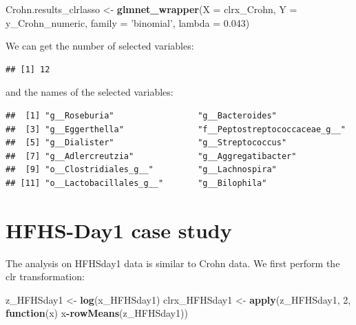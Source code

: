 \documentclass[openany]{book}
\newenvironment{Shaded}{\begin{snugshade}}{\end{snugshade}}
\newcommand{\KeywordTok}[1]{\textcolor[rgb]{0.13,0.29,0.53}{\textbf{#1}}}
\newcommand{\DataTypeTok}[1]{\textcolor[rgb]{0.13,0.29,0.53}{#1}}
\newcommand{\DecValTok}[1]{\textcolor[rgb]{0.00,0.00,0.81}{#1}}
\newcommand{\FloatTok}[1]{\textcolor[rgb]{0.00,0.00,0.81}{#1}}
\newcommand{\StringTok}[1]{\textcolor[rgb]{0.31,0.60,0.02}{#1}}
\newcommand{\ControlFlowTok}[1]{\textcolor[rgb]{0.13,0.29,0.53}{\textbf{#1}}}
\newcommand{\OperatorTok}[1]{\textcolor[rgb]{0.81,0.36,0.00}{\textbf{#1}}}
\newcommand{\NormalTok}[1]{#1}
\begin{document}
\begin{Shaded}
\begin{Highlighting}[]
\NormalTok{Crohn.results_clrlasso <-}\StringTok{ }\KeywordTok{glmnet_wrapper}\NormalTok{(}\DataTypeTok{X =}\NormalTok{ clrx_Crohn, }\DataTypeTok{Y =}\NormalTok{ y_Crohn_numeric, }
                                         \DataTypeTok{family =} \StringTok{'binomial'}\NormalTok{, }\DataTypeTok{lambda =} \FloatTok{0.043}\NormalTok{)}
\end{Highlighting}
\end{Shaded}

We can get the number of selected variables:

\begin{Shaded}
\end{Shaded}

\begin{verbatim}
## [1] 12
\end{verbatim}

and the names of the selected variables:

\begin{Shaded}
\end{Shaded}

\begin{verbatim}
##  [1] "g__Roseburia"                 "g__Bacteroides"              
##  [3] "g__Eggerthella"               "f__Peptostreptococcaceae_g__"
##  [5] "g__Dialister"                 "g__Streptococcus"            
##  [7] "g__Adlercreutzia"             "g__Aggregatibacter"          
##  [9] "o__Clostridiales_g__"         "g__Lachnospira"              
## [11] "o__Lactobacillales_g__"       "g__Bilophila"
\end{verbatim}

\section{HFHS-Day1 case study}\label{hfhs-day1-case-study-1}

The analysis on HFHSday1 data is similar to Crohn data. We first perform
the clr transformation:

\begin{Shaded}
\begin{Highlighting}[]
\NormalTok{z_HFHSday1 <-}\StringTok{ }\KeywordTok{log}\NormalTok{(x_HFHSday1)}
\NormalTok{clrx_HFHSday1 <-}\StringTok{ }\KeywordTok{apply}\NormalTok{(z_HFHSday1, }\DecValTok{2}\NormalTok{, }\ControlFlowTok{function}\NormalTok{(x) x}\OperatorTok{-}\KeywordTok{rowMeans}\NormalTok{(z_HFHSday1))}
\end{Highlighting}
\end{Shaded}
\end{document}
